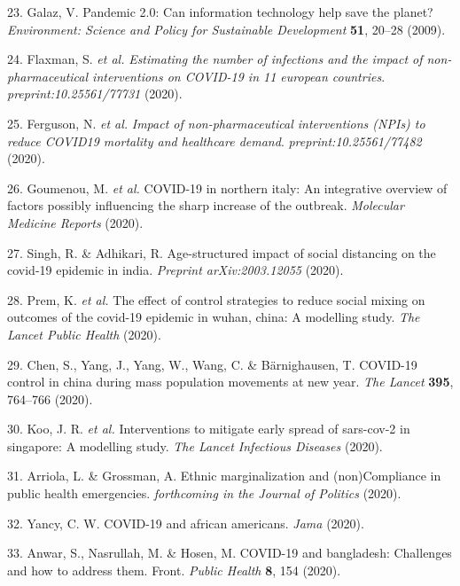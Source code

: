 \documentclass[]{article}
\begin{document}
\leavevmode\hypertarget{ref-galaz2009pandemic}{}%
23. Galaz, V. Pandemic 2.0: Can information technology help save the planet? \emph{Environment: Science and Policy for Sustainable Development} \textbf{51}, 20--28 (2009).

\leavevmode\hypertarget{ref-flaxman2020}{}%
24. Flaxman, S. \emph{et al.} \emph{Estimating the number of infections and the impact of non-pharmaceutical interventions on COVID-19 in 11 european countries}. \emph{preprint:10.25561/77731} (2020).

\leavevmode\hypertarget{ref-ferguson2020report}{}%
25. Ferguson, N. \emph{et al.} \emph{Impact of non-pharmaceutical interventions (NPIs) to reduce COVID19 mortality and healthcare demand}. \emph{preprint:10.25561/77482} (2020).

\leavevmode\hypertarget{ref-goumenou2020covid}{}%
26. Goumenou, M. \emph{et al.} COVID-19 in northern italy: An integrative overview of factors possibly influencing the sharp increase of the outbreak. \emph{Molecular Medicine Reports} (2020).

\leavevmode\hypertarget{ref-singh2020age}{}%
27. Singh, R. \& Adhikari, R. Age-structured impact of social distancing on the covid-19 epidemic in india. \emph{Preprint arXiv:2003.12055} (2020).

\leavevmode\hypertarget{ref-prem2020effect}{}%
28. Prem, K. \emph{et al.} The effect of control strategies to reduce social mixing on outcomes of the covid-19 epidemic in wuhan, china: A modelling study. \emph{The Lancet Public Health} (2020).

\leavevmode\hypertarget{ref-chen2020covid}{}%
29. Chen, S., Yang, J., Yang, W., Wang, C. \& Bärnighausen, T. COVID-19 control in china during mass population movements at new year. \emph{The Lancet} \textbf{395}, 764--766 (2020).

\leavevmode\hypertarget{ref-koo2020interventions}{}%
30. Koo, J. R. \emph{et al.} Interventions to mitigate early spread of sars-cov-2 in singapore: A modelling study. \emph{The Lancet Infectious Diseases} (2020).

\leavevmode\hypertarget{ref-arriola2020}{}%
31. Arriola, L. \& Grossman, A. Ethnic marginalization and (non)Compliance in public health emergencies. \emph{forthcoming in the Journal of Politics} (2020).

\leavevmode\hypertarget{ref-yancy2020covid}{}%
32. Yancy, C. W. COVID-19 and african americans. \emph{Jama} (2020).

\leavevmode\hypertarget{ref-anwar2020covid}{}%
33. Anwar, S., Nasrullah, M. \& Hosen, M. COVID-19 and bangladesh: Challenges and how to address them. Front. \emph{Public Health} \textbf{8}, 154 (2020).
\end{document}
